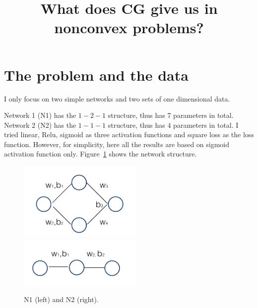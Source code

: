 \documentclass[12pt]{article}
\begin{document}
 
 
 
\title{What does CG give us in nonconvex problems?}%
\date{\vspace{-10ex}}
\maketitle
 

\section{The problem and the data}


I only focus on two simple networks and two sets of one dimensional data.


Network 1 (N1) has the $1-2-1$ structure, thus has 7 parameters in total. Network 2 (N2) has the $1-1-1$ structure, thus has $4$ parameters in total. I tried linear, Relu, sigmoid as three activation functions and square loss as the loss function. However, for simplicity, here all the results are based on sigmoid activation function only. Figure~\ref{fig:n} shows the network structure.
\begin{figure}[h]
\centering
\includegraphics[width=6cm]{n1}
\includegraphics[width=6cm]{n2}
\caption{N1 (left) and N2 (right).}
\label{fig:n}
\end{figure}
\end{document}
